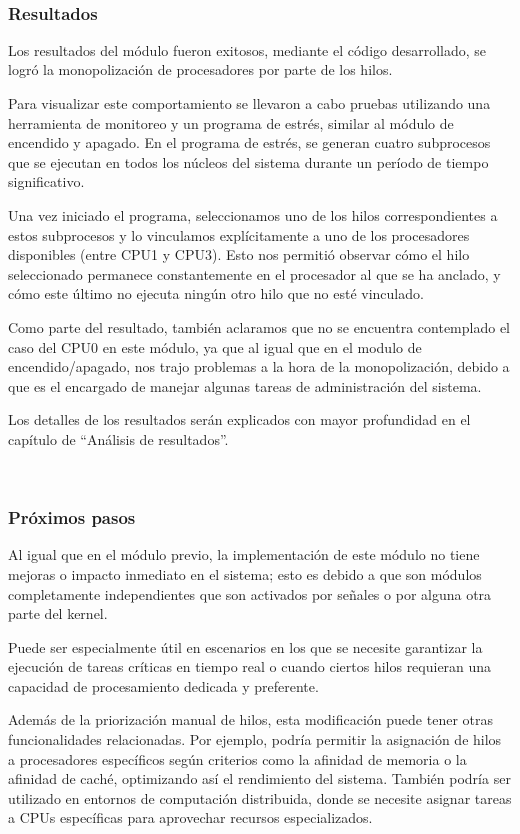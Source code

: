 \

\subsubsection{Resultados}

Los resultados del módulo fueron exitosos, mediante el código desarrollado, se logró la monopolización de procesadores por parte de los hilos.

Para visualizar este comportamiento se llevaron a cabo pruebas utilizando una herramienta de monitoreo y un programa de estrés, similar al módulo de encendido y apagado. En el programa de estrés, se generan cuatro subprocesos que se ejecutan en todos los núcleos del sistema durante un período de tiempo significativo.

Una vez iniciado el programa, seleccionamos uno de los hilos correspondientes a estos subprocesos y lo vinculamos explícitamente a uno de los procesadores disponibles (entre CPU1 y CPU3). Esto nos permitió observar cómo el hilo seleccionado permanece constantemente en el procesador al que se ha anclado, y cómo este último no ejecuta ningún otro hilo que no esté vinculado.

Como parte del resultado, también aclaramos que no se encuentra contemplado el caso del CPU0 en este módulo, ya que al igual que en el modulo de encendido/apagado, nos trajo problemas a la hora de la monopolización, debido a que es el encargado de manejar algunas tareas de administración del sistema.

Los detalles de los resultados serán explicados con mayor profundidad en el capítulo de
“Análisis de resultados”.


\

\subsubsection{Próximos pasos}

Al igual que en el módulo previo, la implementación de este módulo no tiene mejoras o impacto inmediato en el sistema; esto es debido a que son módulos completamente independientes que son activados por señales o por alguna otra parte del kernel.

Puede ser especialmente útil en escenarios en los que se necesite garantizar la ejecución de tareas críticas en tiempo real o cuando ciertos hilos requieran una capacidad de procesamiento dedicada y preferente.

Además de la priorización manual de hilos, esta modificación puede tener otras funcionalidades relacionadas. Por ejemplo, podría permitir la asignación de hilos a procesadores específicos según criterios como la afinidad de memoria o la afinidad de caché, optimizando así el rendimiento del sistema. También podría ser utilizado en entornos de computación distribuida, donde se necesite asignar tareas a CPUs específicas para aprovechar recursos especializados.
